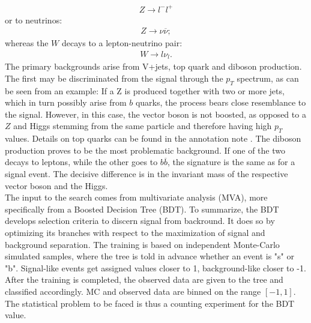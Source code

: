 \documentclass[aps,prb,twocolumn,showpacs,superscriptaddress,groupedaddress]{revtex4}  %
\begin{document}
\begin{align*}
Z \rightarrow l^{-}l^{+}
\end{align*}
or to neutrinos:
\begin{align*}
Z \rightarrow \nu\overline{\nu};
\end{align*}
whereas the $W$ decays to a lepton-neutrino pair:
\begin{align*}
W \rightarrow l\nu_{l}.
\end{align*}
The primary backgrounds arise from V+jets, top quark and diboson production. The first may be discriminated from the signal through the $p_{T}$ spectrum, as can be seen from an example: If a Z is produced together with two or more jets, which in turn possibly arise from $b$ quarks, the process bears close resemblance to the signal. However, in this case, the vector boson is not boosted, as opposed to a $Z$ and Higgs stemming from the same particle and therefore having high $p_{T}$ values. Details on top quarks can be found in the annotation note \cite{annote}. The diboson production proves to be the most problematic background. If one of the two decays to leptons, while the other goes to $b\overline{b}$, the signature is the same as for a signal event. The decisive difference is in the invariant mass of the respective vector boson and the Higgs.\\
The input to the search comes from multivariate ana\-lysis (MVA), more specifically from a Boosted Decision Tree (BDT). To summarize, the BDT develops selection criteria to discern signal from backround. It does so by optimizing its branches with respect to the maximization of signal and background separation. The trai\-ning is based on independent Monte-Carlo simulated samples, where the tree is told in advance whether an event is "s" or "b". Signal-like events get assigned values closer to 1, background-like closer to -1. After the training is completed, the observed data are given to the tree and classified accordingly. MC and observed data are binned on the range $[-1,1]$. The statistical problem to be faced is thus a counting experiment for the BDT value.
\end{document}
